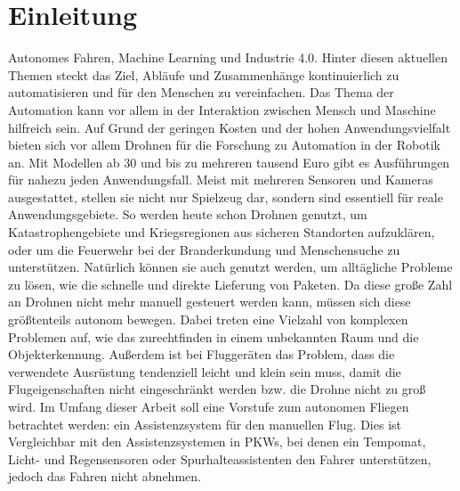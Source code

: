 

\pagestyle{plain}
\chapter{Einleitung}
\label{cha:Introduction}
Autonomes Fahren, Machine Learning und Industrie 4.0. Hinter diesen aktuellen Themen steckt das Ziel, Abläufe und Zusammenhänge kontinuierlich zu automatisieren und für den Menschen zu vereinfachen. Das Thema der Automation kann vor allem in der Interaktion zwischen Mensch und Maschine hilfreich sein. Auf Grund der geringen Kosten und der hohen Anwendungsvielfalt bieten sich vor allem Drohnen für die Forschung zu Automation in der Robotik an. \newline
Mit Modellen ab 30 und bis zu mehreren tausend Euro gibt es Ausführungen für nahezu jeden Anwendungsfall. Meist mit mehreren Sensoren und Kameras ausgestattet, stellen sie nicht nur Spielzeug dar, sondern sind essentiell für reale Anwendungsgebiete. \newline
So werden heute schon Drohnen genutzt, um Katastrophengebiete und Kriegsregionen aus sicheren Standorten aufzuklären, oder um die Feuerwehr bei der Branderkundung und Menschensuche zu unterstützen. \newline
Natürlich können sie auch genutzt werden, um alltägliche Probleme zu lösen, wie die schnelle und direkte Lieferung von Paketen. \newline
Da diese große Zahl an Drohnen nicht mehr manuell gesteuert werden kann, müssen sich diese größtenteils autonom bewegen. Dabei treten eine Vielzahl von komplexen Problemen auf, wie das zurechtfinden in einem unbekannten Raum und die Objekterkennung. \newline
Außerdem ist bei Fluggeräten das Problem, dass die verwendete Ausrüstung tendenziell leicht und klein sein muss, damit die Flugeigenschaften nicht eingeschränkt werden bzw. die Drohne nicht zu groß wird. \newline
Im Umfang dieser Arbeit soll eine Vorstufe zum autonomen Fliegen betrachtet werden: ein Assistenzsystem für den manuellen Flug. Dies ist Vergleichbar mit den Assistenzsystemen in PKWs, bei denen ein Tempomat, Licht- und Regensensoren oder Spurhalteassistenten den Fahrer unterstützen, jedoch das Fahren nicht abnehmen. \newline



